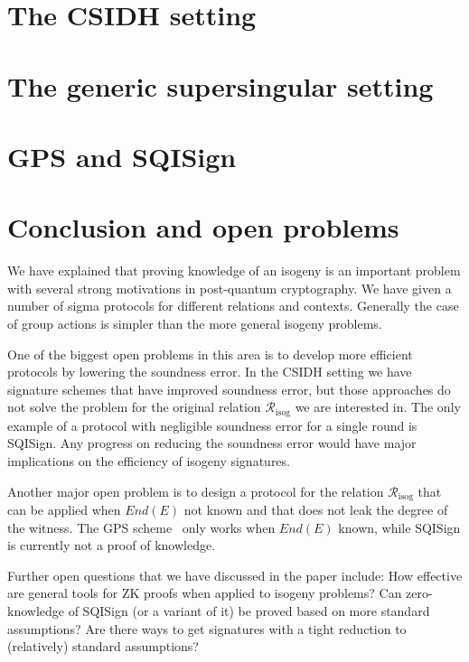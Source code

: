 \documentclass{llncs}
\newcommand{\R}[1][]{\ensuremath{\mathcal{R}_{\mathrm{#1}}}}
\begin{document}






\section{The CSIDH setting\label{sec:CSIDH-setting}}






\section{The generic supersingular setting \label{sec:SIDH-setting}}





\section{GPS and SQISign\label{sec:GPSandSQIsign}}



\section{Conclusion and open problems\label{sec:conclusion}}

We have explained that proving knowledge of an isogeny is an important problem with several strong motivations in post-quantum cryptography.
%
We have given a number of sigma protocols for different relations and contexts. Generally the case of group actions is simpler than the more general isogeny problems.

One of the biggest open problems in this area is to develop more efficient protocols by lowering the soundness error.
In the CSIDH setting we have signature schemes that have improved soundness error, but those approaches do not solve the problem for the original relation $\R[isog]$ we are interested in.
The only example of a protocol with negligible soundness error for a single round is SQISign.
Any progress on reducing the soundness error would have major implications on the efficiency of isogeny signatures.

Another major open problem is to design a protocol for the relation $\R[isog]$ that can be applied when $End(E)$ not known and that does not leak the degree of the witness. The GPS scheme~\cite{GPS20} only works when $End(E)$ known, while SQISign is currently not a proof of knowledge.


Further open questions that we have discussed in the paper include:
How effective are general tools for ZK proofs when applied to isogeny problems?
Can zero-knowledge of SQISign (or a variant of it) be proved based on more standard assumptions?
Are there ways to get signatures with a tight reduction to (relatively) standard assumptions?




\end{document}
